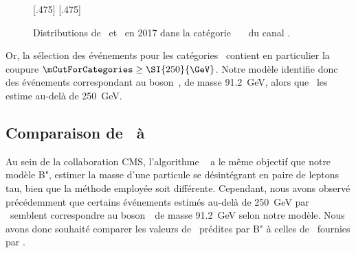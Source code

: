\begin{figure}[h]
\centering

[.475\textwidth]
{}
\hfill
{}[.475\textwidth]
{}

\caption[Distributions de \mTtot\ et \mml\ en 2017 dans la catégorie \CATbsm\ \CATnobtag\ \CATloosemt\ du canal \mu\tauh.]{Distributions de \mTtot\ et \mml\ en 2017 dans la catégorie \CATbsm\ \CATnobtag\ \CATloosemt\ du canal \mu\tauh.}
\label{fig-distributions_mml_mttot_2017_mt_BSM_nobtag_loosemt}
\end{figure}
Or, la sélection des événements pour les catégories \CATbsm\ contient en particulier la coupure
$\mCutForCategories \geq \SI{250}{\GeV}$.
Notre modèle identifie donc des événements correspondant au boson~\Zboson,
de masse \SI{91.2}{\GeV},
alors que \SVFIT\ les estime au-delà de \SI{250}{\GeV}.
\subsection{Comparaison de \mml\ à \msv}
Au sein de la collaboration CMS, l'algorithme \SVFIT~\cite{SVFit_Bianchini_2014} a le même objectif que notre modèle B",
estimer la masse d'une particule se désintégrant en paire de leptons tau,
bien que la méthode employée soit différente.
Cependant, nous avons observé précédemment que certains événements estimés au-delà de \SI{250}{\GeV} par \SVFIT\ semblent correspondre au boson~\Zboson\ de masse \SI{91.2}{\GeV} selon notre modèle.
Nous avons donc souhaité comparer
les valeurs de \mml\ prédites par B"
à celles de \msv\ fournies par \SVFIT.
